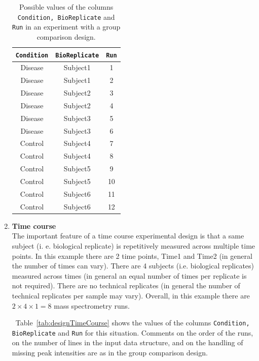 \documentclass[11pt]{article}
\def\tabref#1{Table~\ref{tab:#1}}
\begin{document}
\begin{enumerate}
\vspace{0.3cm}
\begin{table}[h!]
\small
\begin{center}
\begin{tabular}{|c|c|c|}
  \hline
{\tt Condition} &   {\tt BioReplicate} &   	{\tt Run} \\ \hline \hline
Disease	&		Subject1	&		1\\ \hline
Disease	&		Subject1	&		2\\ \hline
Disease	&		Subject2	&		3\\ \hline
Disease	&		Subject2	&		4\\ \hline
Disease	&		Subject3	&		5\\	\hline
Disease	&		Subject3	&		6\\	\hline
Control	&		Subject4	&		7\\	\hline
Control	&		Subject4	&		8\\ \hline
Control	&		Subject5	&		9\\	\hline
Control	&		Subject5	&		10\\ \hline
Control	&		Subject6	&		11\\	\hline
Control	&		Subject6	&		12\\ \hline
\end{tabular}
\caption{Possible values of the columns {\tt Condition, BioReplicate} and {\tt Run} in an experiment with a group comparison design.
\label{tab:designGroupComparison}}
\end{center}
\end{table}


\vspace{0.3cm}
\item {\bf Time course}\\
The important feature of a time course experimental design is that a same subject (i. e. biological replicate) is repetitively measured across multiple time points. In this example there are 2 time points, Time1 and Time2 (in general the number of times can vary). There are 4 subjects (i.e. biological replicates) measured across times (in general an equal number of times per replicate is not required). There are no technical replicates (in general the number of technical replicates per sample may vary). Overall, in this example there are $2  \times 4 \times 1 = 8$ mass spectrometry runs.  

~\tabref{designTimeCourse} shows the values of the columns {\tt Condition, BioReplicate} and {\tt Run} for this situation. Comments on the order of the runs, on the number of lines in the input data structure, and on the handling of missing peak intensities are as in the group comparison design.


\end{enumerate}
\end{document}
